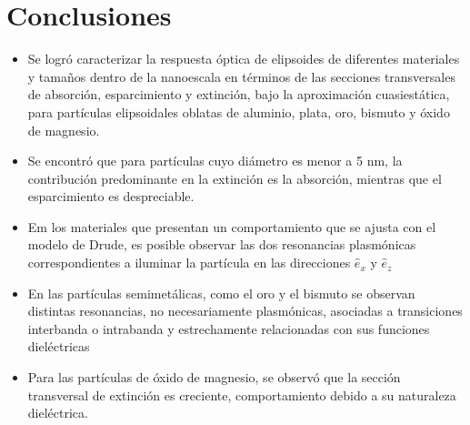 \section{Conclusiones}
\begin{itemize}
	
	\item Se logró caracterizar la respuesta óptica de elipsoides de diferentes materiales y tamaños dentro de la nanoescala en términos de las secciones transversales de absorción, esparcimiento y extinción, bajo la aproximación cuasiestática, para partículas elipsoidales oblatas de aluminio, plata, oro, bismuto y óxido de magnesio. 
	\item Se encontró que para partículas cuyo diámetro es menor a 5 nm, la contribución predominante en la extinción es la absorción, mientras que el esparcimiento es despreciable.
	\item Em los materiales que presentan un comportamiento que se ajusta con el modelo de Drude, es posible observar las dos resonancias plasmónicas correspondientes a iluminar la partícula en las direcciones $\hat{e}_x$ y $\hat{e}_z$
	\item En las partículas semimetálicas, como el oro y el bismuto se observan distintas resonancias, no necesariamente plasmónicas, asociadas a transiciones interbanda o intrabanda y estrechamente relacionadas con sus funciones dieléctricas
	\item Para las partículas de óxido de magnesio, se observó que la sección transversal de extinción es creciente, comportamiento debido a su naturaleza dieléctrica.
	
	
	\end{itemize}

